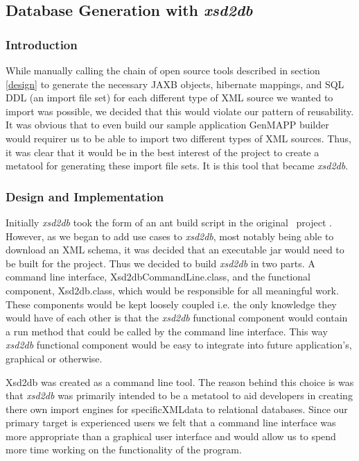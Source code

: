 \subsection{Database Generation with \emph{xsd2db}}
\label{xsd2db}
\subsubsection{Introduction}
While manually calling the chain of open source tools described in section \ref{design} to generate the necessary JAXB objects, hibernate mappings, and SQL DDL (an import file set) for each different type of XML source we wanted to import was possible, we decided that this would violate our pattern of reusability.  It was obvious that to even build our sample application GenMAPP builder would requirer us to be able to import two different types of XML sources.   Thus, it was clear that it would be in the best interest of the project to create a metatool for generating these import file sets.  It is this tool that became \emph{xsd2db}.
    
\subsubsection{Design and Implementation}
Initially \emph{xsd2db} took the form of an ant build script in the original \xmlpipedb~project \cite{xmlpipedb}.  However, as we began to add use cases to \emph{xsd2db}, most notably being able to download an XML schema,  it was decided that an executable jar would need to be built for the project.  Thus we decided to build \emph{xsd2db} in two parts.  A command line interface, Xsd2dbCommandLine.class, and the functional component, Xsd2db.class, which would be responsible for all meaningful work.  These components would be kept loosely coupled i.e. the only knowledge they would have of each other is that  the \emph{xsd2db} functional component would contain a run method that could be called by the command line interface.  This way \emph{xsd2db} functional component would be easy to integrate into future application's, graphical or otherwise.   

Xsd2db was created as a command line tool.  The reason behind this choice is was that \emph{xsd2db} was primarily intended to be a metatool to aid developers in creating there own import engines for specificXMLdata to relational databases.  Since our primary target is experienced users we felt that a command line interface was more appropriate than a graphical user interface and would allow us to spend more time working on the functionality of the program.    

